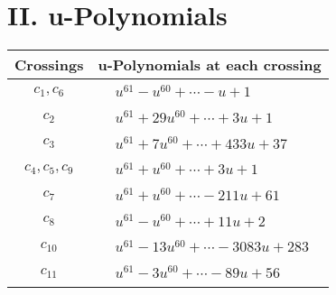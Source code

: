 \documentclass[1p]{elsarticle_modified}
\theoremstyle{definition}
\begin{document}
\newpage\renewcommand{\arraystretch}{1}
\centering \section*{ II. u-Polynomials}
\begin{tabular}{m{50pt}|m{274pt}}
Crossings & \hspace{64pt}u-Polynomials at each crossing \\
\hline $$\begin{aligned}c_{1},c_{6}\end{aligned}$$&$\begin{aligned}
&u^{61}- u^{60}+\cdots- u+1
\end{aligned}$\\
\hline $$\begin{aligned}c_{2}\end{aligned}$$&$\begin{aligned}
&u^{61}+29 u^{60}+\cdots+3 u+1
\end{aligned}$\\
\hline $$\begin{aligned}c_{3}\end{aligned}$$&$\begin{aligned}
&u^{61}+7 u^{60}+\cdots+433 u+37
\end{aligned}$\\
\hline $$\begin{aligned}c_{4},c_{5},c_{9}\end{aligned}$$&$\begin{aligned}
&u^{61}+u^{60}+\cdots+3 u+1
\end{aligned}$\\
\hline $$\begin{aligned}c_{7}\end{aligned}$$&$\begin{aligned}
&u^{61}+u^{60}+\cdots-211 u+61
\end{aligned}$\\
\hline $$\begin{aligned}c_{8}\end{aligned}$$&$\begin{aligned}
&u^{61}- u^{60}+\cdots+11 u+2
\end{aligned}$\\
\hline $$\begin{aligned}c_{10}\end{aligned}$$&$\begin{aligned}
&u^{61}-13 u^{60}+\cdots-3083 u+283
\end{aligned}$\\
\hline $$\begin{aligned}c_{11}\end{aligned}$$&$\begin{aligned}
&u^{61}-3 u^{60}+\cdots-89 u+56
\end{aligned}$\\
\hline
\end{tabular}\newpage\renewcommand{\arraystretch}{1}
\end{document}
